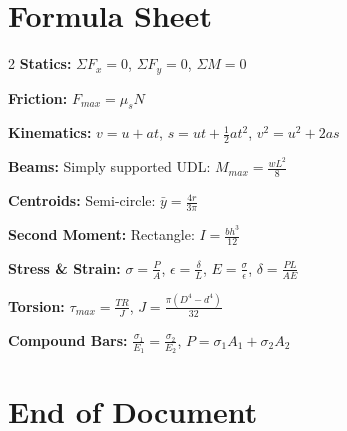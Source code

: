 \documentclass[12pt,a4paper]{article}
\begin{document}
\section*{Formula Sheet}
\begin{tcolorbox}[colback=blue!5!white, colframe=examblue, title=\textbf{Mechanics Formula Sheet}]
\begin{multicols}{2}
\textbf{Statics:} $\Sigma F_x=0$, $\Sigma F_y=0$, $\Sigma M=0$

\textbf{Friction:} $F_{max} = \mu_s N$

\textbf{Kinematics:} $v=u+at$, $s=ut+\frac{1}{2}at^2$, $v^2=u^2+2as$

\textbf{Beams:} Simply supported UDL: $M_{max}=\frac{wL^2}{8}$

\textbf{Centroids:} Semi-circle: $\bar{y}=\frac{4r}{3\pi}$

\textbf{Second Moment:} Rectangle: $I=\frac{bh^3}{12}$

\textbf{Stress \& Strain:} $\sigma=\frac{P}{A}$, $\epsilon=\frac{\delta}{L}$, $E=\frac{\sigma}{\epsilon}$, $\delta=\frac{PL}{AE}$

\textbf{Torsion:} $\tau_{max}=\frac{TR}{J}$, $J=\frac{\pi(D^4-d^4)}{32}$

\textbf{Compound Bars:} $\frac{\sigma_1}{E_1} = \frac{\sigma_2}{E_2}$, $P = \sigma_1 A_1 + \sigma_2 A_2$
\end{multicols}
\end{tcolorbox}

\newpage
\section*{End of Document}
\end{document}
